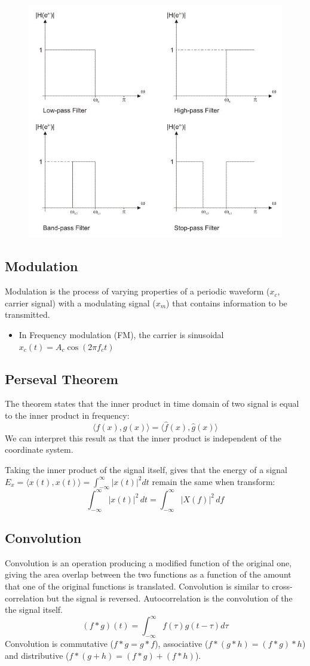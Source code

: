 \documentclass[twocolumn]{article}
\numberwithin{equation}{section}
\begin{document}
\begin{figure}[H]
\centering
    \includegraphics[width=.25\textwidth]{disco-house-types-of-filtering.png}
\end{figure}


		
	\subsection{Modulation}
Modulation is the process of varying properties of a periodic waveform ($x_c$, carrier signal) with a modulating signal ($x_m$) that contains information to be transmitted.
\begin{itemize}
	\item In Frequency modulation (FM), the carrier is sinusoidal $x_c(t) = A_c \cos (2 \pi f_c t)$ 
\end{itemize}



	\subsection{Perseval Theorem}
The theorem states that the inner product in time domain of two signal is equal to the inner product in frequency:
$$\langle f(x),g(x) \rangle = \langle \hat{f}(x),\hat{g}(x) \rangle $$
We can interpret this result as that the inner product is independent of the coordinate system. 

Taking the inner product of the signal itself, gives that the energy of a signal $E_{x} = \langle x(t), x(t)\rangle =  \int_{-\infty}^{\infty}{|x(t)|^2}dt$ remain the same when transform: 
$$\int_{-\infty}^\infty | x(t) |^2 \, dt   =   \int_{-\infty}^\infty | X(f) |^2 \, df  $$
	
	
	\subsection{Convolution} \label{subsec:convolution}
Convolution is an operation producing a modified function of the original one, giving the area overlap between the two functions as a function of the amount that one of the original functions is translated. Convolution is similar to cross-correlation but the signal is reversed. Autocorrelation is the convolution of the the signal itself.
$$ (f * g )(t) = \int_{-\infty}^\infty f(\tau) g(t - \tau) d\tau $$
Convolution is commutative ($f*g=g*f$), associative ($f*(g*h)=(f*g)*h$) and distributive ($f*(g+h)=(f*g)+(f*h)$).
\end{document}

